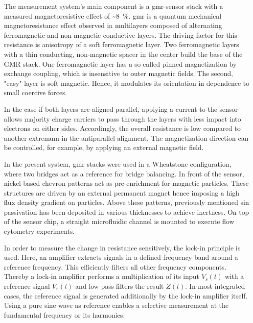 The measurement system's main component is a \gls{gmr}-sensor stack with a measured magnetoresistive effect of \textasciitilde \SI{8}{\percent}. \gls{gmr} is a quantum mechanical magnetoresistance effect observed in multilayers composed of alternating ferromagnetic and non-magnetic conductive layers. The driving factor for this resistance is anisotropy of a soft ferromagnetic layer. Two ferromagnetic layers with a thin conducting, non-magnetic spacer in the center build the base of the GMR stack.\cite{lit:nano:magnetism} One ferromagnetic layer has a so called pinned magnetization by exchange coupling, which is insensitive to outer magnetic fields. The second, "easy" layer is soft magnetic. Hence, it modulates its orientation in dependence to small coercive forces. \cite{lit:nano:Guimares2017}

In the case if both layers are aligned parallel, applying a current to the sensor allows majority charge carriers to pass through the layers with less impact into electrons on either sides. Accordingly, the overall resistance is low compared to another extremum in the antiparallel alignment. The magnetization direction can be controlled, for example, by applying an external magnetic field.\cite{lit:nano:physicsmagneticmaterials, lit:nano:GMRPatent} 

In the present system, \gls{gmr} stacks were used in a Wheatstone configuration, where two bridges act as a reference for bridge balancing. In front of the sensor, nickel-based chevron patterns act as pre-enrichment for magnetic particles. These structures are driven by an external permanent magnet hence imposing a high flux density gradient on particles. Above these patterns, previously mentioned \gls{sin} passivation has been deposited in various thicknesses to achieve inertness. On top of the sensor chip, a straight microfluidic channel is mounted to execute flow cytometry experiments.\cite{lit:paperHelou,lit:paperReisbeck}

In order to measure the change in resistance sensitively, the lock-in principle is used. Here, an amplifier extracts signals in a defined frequency band around a reference frequency. This efficiently filters all other frequency components. Thereby a lock-in amplifier performs a multiplication of its input $V_s(t)$ with a reference signal $V_r(t)$ and low-pass filters the result $Z(t)$. In most integrated cases, the reference signal is generated additionally by the lock-in amplifier itself. Using a pure sine wave as reference enables a selective measurement at the fundamental frequency or its harmonics.\cite{lit:nano:lockin} 

